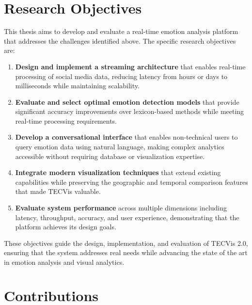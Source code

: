 
\section{Research Objectives}

This thesis aims to develop and evaluate a real-time emotion analysis platform that addresses the challenges identified above. The specific research objectives are:

\begin{enumerate}
\item \textbf{Design and implement a streaming architecture} that enables real-time processing of social media data, reducing latency from hours or days to milliseconds while maintaining scalability.

\item \textbf{Evaluate and select optimal emotion detection models} that provide significant accuracy improvements over lexicon-based methods while meeting real-time processing requirements.

\item \textbf{Develop a conversational interface} that enables non-technical users to query emotion data using natural language, making complex analytics accessible without requiring database or visualization expertise.

\item \textbf{Integrate modern visualization techniques} that extend existing capabilities while preserving the geographic and temporal comparison features that made TECVis valuable.

\item \textbf{Evaluate system performance} across multiple dimensions including latency, throughput, accuracy, and user experience, demonstrating that the platform achieves its design goals.
\end{enumerate}

These objectives guide the design, implementation, and evaluation of TECVis 2.0, ensuring that the system addresses real needs while advancing the state of the art in emotion analysis and visual analytics.


\section{Contributions}

